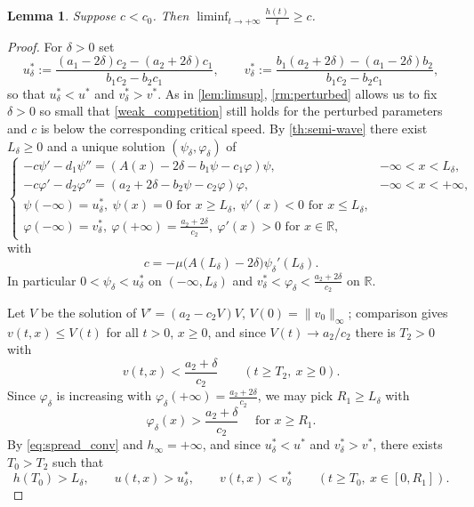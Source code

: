 \documentclass[reqno]{amsart}
\theoremstyle{plain}
\newtheorem{lemma}[theorem]{Lemma}
\theoremstyle{definition}
\theoremstyle{remark}
\begin{document}
\begin{lemma}\label{lem:liminf}
	Suppose $c < c_0$. Then $\displaystyle\liminf_{t \to +\infty} \frac{h(t)}{t} \ge c$.
\end{lemma}

\begin{proof}
	For $\delta>0$ set
	\[
	u^*_\delta:=\frac{(a_1-2\delta)c_2-(a_2+2\delta)c_1}{b_1c_2-b_2c_1},
	\qquad
	v^*_\delta:=\frac{b_1(a_2+2\delta)-(a_1-2\delta)b_2}{b_1c_2-b_2c_1},
	\]
	so that $u^*_\delta<u^*$ and $v^*_\delta>v^*$. As in \cref{lem:limsup},
	\cref{rm:perturbed} allows us to fix $\delta>0$ so small that
	\eqref{weak_competition} still holds for the perturbed parameters and $c$ is
	below the corresponding critical speed. By \cref{th:semi-wave} there exist
	$L_\delta\ge0$ and a unique solution $(\psi_\delta,\varphi_\delta)$ of
	\begin{equation}\label{aux2}
		\begin{cases}
			-c \psi' - d_1 \psi'' = (A(x) -2\delta - b_1\psi - c_1\varphi)\psi, & -\infty < x < L_\delta,\\
			-c \varphi' - d_2 \varphi'' = (a_2 + 2\delta - b_2\psi - c_2\varphi)\varphi, & -\infty < x < +\infty,\\
			\psi(-\infty) = u^*_\delta, ~ \psi(x)=0 \text{ for } x\ge L_\delta, ~ \psi'(x)<0 \text{ for } x\le L_\delta,\\
			\varphi(-\infty) = v^*_\delta, ~ \varphi(+\infty)=\frac{a_2 + 2\delta}{c_2}, ~ \varphi'(x)>0 \text{ for } x\in \mathbb{R},
		\end{cases}
	\end{equation}
	with
	\begin{equation}\label{eq:sw2}
		c = -\mu\big(A(L_\delta) - 2\delta\big)\psi_{\delta}'(L_\delta).
	\end{equation}
	In particular $0<\psi_\delta<u^*_\delta$ on $(-\infty,L_\delta)$ and
	$v^*_\delta<\varphi_\delta<\frac{a_2+2\delta}{c_2}$ on $\mathbb{R}$.

	Let $V$ be the solution of $V'=(a_2-c_2V)V$, $V(0)=\|v_0\|_\infty$; comparison
	gives $v(t,x)\le V(t)$ for all $t>0$, $x\ge0$, and since
	$V(t)\to a_2/c_2$ there is $T_2>0$ with
	\begin{equation}\label{eq:v}
		v(t,x) < \frac{a_2 + \delta}{c_2} \qquad (t \ge T_2,\ x \ge 0).
	\end{equation}
	Since $\varphi_\delta$ is increasing with
	$\varphi_\delta(+\infty)=\frac{a_2+2\delta}{c_2}$, we may pick
	$R_1\ge L_\delta$ with
	\begin{equation}\label{eq:vp}
		\varphi_{\delta}(x) > \frac{a_2+\delta}{c_2} \quad\text{ for } x \ge R_1 .
	\end{equation}
	By \eqref{eq:spread_conv} and $h_\infty=+\infty$, and since $u^*_\delta<u^*$
	and $v^*_\delta>v^*$, there exists $T_0>T_2$ such that
	\begin{equation}\label{eq:uv}
		h(T_0) > L_\delta,\qquad
		u(t,x) > u^*_\delta,\qquad v(t,x) < v^*_\delta
		\qquad (t \ge T_0,\ x \in [0, R_1]).
	\end{equation}


\end{proof}
\end{document}
